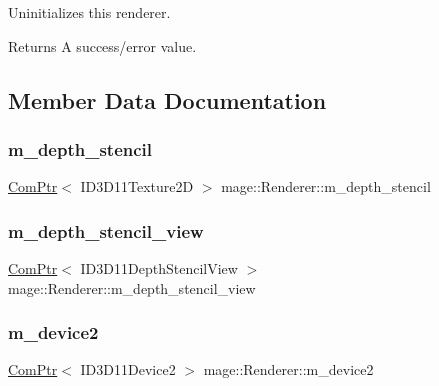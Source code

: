 Uninitializes this renderer.

\begin{DoxyReturn}{Returns}
A success/error value. 
\end{DoxyReturn}


\subsection{Member Data Documentation}
\hypertarget{classmage_1_1_renderer_a9f7f61e09d9c788ab4d3190bc0fa58d8}{}\label{classmage_1_1_renderer_a9f7f61e09d9c788ab4d3190bc0fa58d8} 
\subsubsection{\texorpdfstring{m\+\_\+depth\+\_\+stencil}{m\_depth\_stencil}}
{\footnotesize\ttfamily \hyperlink{namespacemage_ae74f374780900893caa5555d1031fd79}{Com\+Ptr}$<$ I\+D3\+D11\+Texture2D $>$ mage\+::\+Renderer\+::m\+\_\+depth\+\_\+stencil\hspace{0.3cm}{\ttfamily [protected]}}

\hypertarget{classmage_1_1_renderer_aaeefc175b9a619f95229a3f8464a7924}{}\label{classmage_1_1_renderer_aaeefc175b9a619f95229a3f8464a7924} 
\subsubsection{\texorpdfstring{m\+\_\+depth\+\_\+stencil\+\_\+view}{m\_depth\_stencil\_view}}
{\footnotesize\ttfamily \hyperlink{namespacemage_ae74f374780900893caa5555d1031fd79}{Com\+Ptr}$<$ I\+D3\+D11\+Depth\+Stencil\+View $>$ mage\+::\+Renderer\+::m\+\_\+depth\+\_\+stencil\+\_\+view\hspace{0.3cm}{\ttfamily [protected]}}

\hypertarget{classmage_1_1_renderer_a6c9757faeb4de815f024dc8eac89960c}{}\label{classmage_1_1_renderer_a6c9757faeb4de815f024dc8eac89960c} 
\subsubsection{\texorpdfstring{m\+\_\+device2}{m\_device2}}
{\footnotesize\ttfamily \hyperlink{namespacemage_ae74f374780900893caa5555d1031fd79}{Com\+Ptr}$<$ I\+D3\+D11\+Device2 $>$ mage\+::\+Renderer\+::m\+\_\+device2\hspace{0.3cm}{\ttfamily [protected]}}

